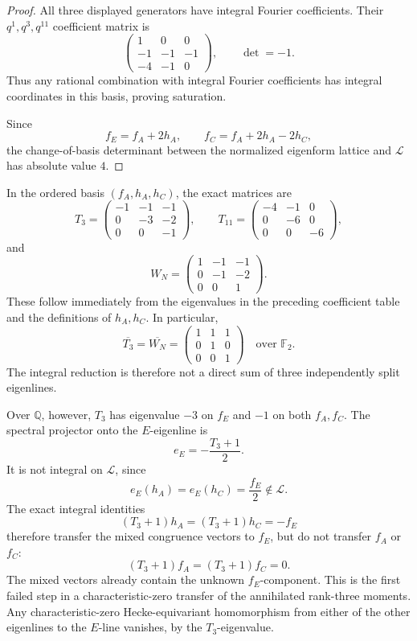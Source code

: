 \documentclass[11pt]{article}
\begin{document}
\begin{proof}
All three displayed generators have integral Fourier
coefficients. Their \(q^1,q^3,q^{11}\) coefficient matrix is
\[
\begin{pmatrix}
1&0&0\\
-1&-1&-1\\
-4&-1&0
\end{pmatrix},
\qquad \det=-1.
\]
Thus any rational combination with integral Fourier
coefficients has integral coordinates in this basis,
proving saturation.

Since
\[
f_E=f_A+2h_A,\qquad
f_C=f_A+2h_A-2h_C,
\]
the change-of-basis determinant between the normalized
eigenform lattice and \(\mathcal L\) has absolute value \(4\).
\end{proof}

In the ordered basis \((f_A,h_A,h_C)\), the exact matrices
are
\[
T_3=
\begin{pmatrix}
-1&-1&-1\\
0&-3&-2\\
0&0&-1
\end{pmatrix},\qquad
T_{11}=
\begin{pmatrix}
-4&-1&0\\
0&-6&0\\
0&0&-6
\end{pmatrix},
\]
and
\[
W_N=
\begin{pmatrix}
1&-1&-1\\
0&-1&-2\\
0&0&1
\end{pmatrix}.
\]
These follow immediately from the eigenvalues in the
preceding coefficient table and the definitions of
\(h_A,h_C\). In particular,
\[
\overline{T_3}=\overline{W_N}=
\begin{pmatrix}
1&1&1\\
0&1&0\\
0&0&1
\end{pmatrix}
\quad\text{over }\mathbb F_2.
\]
The integral reduction is therefore not a direct sum
of three independently split eigenlines.

Over \(\mathbb Q\), however, \(T_3\) has eigenvalue
\(-3\) on \(f_E\) and \(-1\) on both \(f_A,f_C\).
The spectral projector onto the \(E\)-eigenline is
\[
\boxed{e_E=-\frac{T_3+1}{2}.}
\]
It is not integral on \(\mathcal L\), since
\[
e_E(h_A)=e_E(h_C)=\frac{f_E}{2}
\notin\mathcal L.
\]
The exact integral identities
\[
(T_3+1)h_A=(T_3+1)h_C=-f_E
\]
therefore transfer the mixed congruence vectors to
\(f_E\), but do not transfer \(f_A\) or \(f_C\):
\[
(T_3+1)f_A=(T_3+1)f_C=0.
\]
The mixed vectors already contain the unknown
\(f_E\)-component. This is the first failed step in a
characteristic-zero transfer of the annihilated
rank-three moments. Any characteristic-zero Hecke-equivariant homomorphism from either of the other eigenlines to the \(E\)-line vanishes, by the \(T_3\)-eigenvalue.
\end{document}
